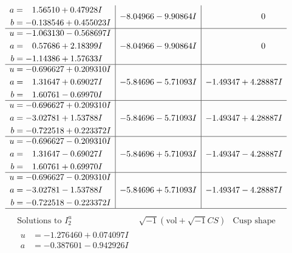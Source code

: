 \documentclass[1p]{elsarticle_modified}
\theoremstyle{definition}
\newcommand{\I}{\sqrt{-1}}
\begin{document}
$$\begin{array}{c|c|c}
\begin{aligned}
a &= \phantom{-}1.56510 + 0.47928 I \\
b &= -0.138546 + 0.455023 I\end{aligned}
 & -8.04966 - 9.90864 I & \phantom{-0.000000 } 0 \\ \hline\begin{aligned}
u &= -1.063130 - 0.568697 I \\
a &= \phantom{-}0.57686 + 2.18399 I \\
b &= -1.14386 + 1.57633 I\end{aligned}
 & -8.04966 - 9.90864 I & \phantom{-0.000000 } 0 \\ \hline\begin{aligned}
u &= -0.696627 + 0.209310 I \\
a &= \phantom{-}1.31647 + 0.69027 I \\
b &= \phantom{-}1.60761 - 0.69970 I\end{aligned}
 & -5.84696 - 5.71093 I & -1.49347 + 4.28887 I \\ \hline\begin{aligned}
u &= -0.696627 + 0.209310 I \\
a &= -3.02781 + 1.53788 I \\
b &= -0.722518 + 0.223372 I\end{aligned}
 & -5.84696 - 5.71093 I & -1.49347 + 4.28887 I \\ \hline\begin{aligned}
u &= -0.696627 - 0.209310 I \\
a &= \phantom{-}1.31647 - 0.69027 I \\
b &= \phantom{-}1.60761 + 0.69970 I\end{aligned}
 & -5.84696 + 5.71093 I & -1.49347 - 4.28887 I \\ \hline\begin{aligned}
u &= -0.696627 - 0.209310 I \\
a &= -3.02781 - 1.53788 I \\
b &= -0.722518 - 0.223372 I\end{aligned}
 & -5.84696 + 5.71093 I & -1.49347 - 4.28887 I\\
 \hline 
 \end{array}$$\newpage$$\begin{array}{c|c|c}  
\text{Solutions to }I^u_{2}& \I (\text{vol} + \sqrt{-1}CS) & \text{Cusp shape}\\
 \hline 
\begin{aligned}
u &= -1.276460 + 0.074097 I \\
a &= -0.387601 - 0.942926 I \\

\end{aligned}
\end{array}$$
\end{document}
